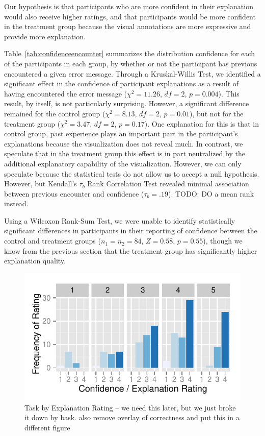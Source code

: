 \documentclass[conference]{IEEEtran}
\begin{document}
Our hypothesis is that participants who are more confident in their explanation would also receive higher ratings, and that participants would be more confident in the treatment group because the visual annotations are more expressive and provide more explanation.

Table~\ref{tab:confidenceencounter} summarizes the distribution confidence for each of the participants in each group, by whether or not the participant has previous encountered a given error message. Through a Kruskal-Willis Test, we identified a significant effect in the confidence of participant explanations as a result of having encountered the error message ($\chi^2 = 11.26$, $df = 2$, $p = 0.004$). This result, by itself, is not particularly surprising. However, a significant difference remained for the control group ($\chi^2 = 8.13$, $df = 2$, $p = 0.01$), but not for the treatment group ($\chi^2 = 3.47$, $df = 2$, $p = 0.17$). One explanation for this is that in control group, past experience plays an important part in the participant's explanations because the visualization does not reveal much. In contrast, we speculate that in the treatment group this effect is in part neutralized by the additional explanatory capability of the visualization. However, we can only speculate because the statistical tests do not allow us to accept a null hypothesis. However, but Kendall's $\tau_b$ Rank Correlation Test revealed minimal association between previous encounter and confidence ($\tau_b = .19$). TODO: DO a mean rank instead.

Using a Wilcoxon Rank-Sum Test, we were unable to identify statistically significant differences in participants in their reporting of confidence between the control and treatment groups ($n_1=n_2=84$, $Z = 0.58$, $p = 0.55$), though we know from the previous section that the treatment group has significantly higher explanation quality. 

\begin{figure}[!t]
\centering
\includegraphics[width=\columnwidth]{confidence_explanation}
\caption{Task by Explanation Rating -- we need this later, but we just broke it down by bask. also remove overlay of correctness and put this in a different figure}\label{fig:explanationbytask}
\end{figure}
\end{document}
